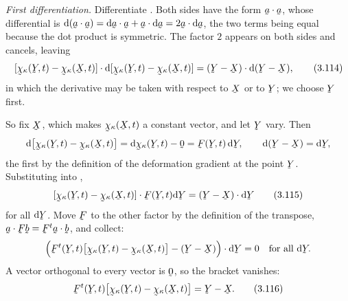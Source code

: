 \emph{First differentiation.} Differentiate . Both sides have the
form $\ip\ba\ba$, whose differential is
$\dl(\ip\ba\ba)=\ip{\dl\ba}{\ba}+\ip{\ba}{\dl\ba}=2\ip{\ba}{\dl\ba}$, the
two terms being equal because the dot product is symmetric. The factor $2$
appears on both sides and cancels, leaving
\begin{equation}
   \ip{[\bchi_{\kappa}(\bY,t)-\bchi_{\kappa}(\bX,t)]}
      {\dl[\bchi_{\kappa}(\bY,t)-\bchi_{\kappa}(\bX,t)]}
   =\ip{(\bY-\bX)}{\dl(\bY-\bX)},
   \tag{3.114}\label{eq:3.114}
\end{equation}
in which the derivative may be taken with respect to $\bX$ or to $\bY$; we
choose $\bY$ first.

So fix $\bX$, which makes $\bchi_{\kappa}(\bX,t)$ a constant vector, and
let $\bY$ vary. Then
\[
   \dl\big[\bchi_{\kappa}(\bY,t)-\bchi_{\kappa}(\bX,t)\big]
   =\dl\bchi_{\kappa}(\bY,t)-\bze=\bF(\bY,t)\,\dl\bY,
   \qquad
   \dl(\bY-\bX)=\dl\bY ,
\]
the first by the definition  of the deformation gradient at the
point $\bY$. Substituting into ,
\begin{equation}
   \ip{[\bchi_{\kappa}(\bY,t)-\bchi_{\kappa}(\bX,t)]}{\bF(\bY,t)\dl\bY}
   =\ip{(\bY-\bX)}{\dl\bY}
   \tag{3.115}\label{eq:3.115}
\end{equation}
for all $\dl\bY$. Move $\bF$ to the other factor by the definition of the
transpose, $\ip{\ba}{\bF\bb}=\ip{\bF^{t}\ba}{\bb}$, and collect:
\[
   \ip{\Big(\bF^{t}(\bY,t)\big[\bchi_{\kappa}(\bY,t)
      -\bchi_{\kappa}(\bX,t)\big]-(\bY-\bX)\Big)}{\dl\bY}=0
   \quad\text{for all }\dl\bY .
\]
A vector orthogonal to every vector is $\bze$, so the bracket vanishes:
\begin{equation}
   \bF^{t}(\bY,t)\big[\bchi_{\kappa}(\bY,t)-\bchi_{\kappa}(\bX,t)\big]
   =\bY-\bX .
   \tag{3.116}\label{eq:3.116}
\end{equation}

